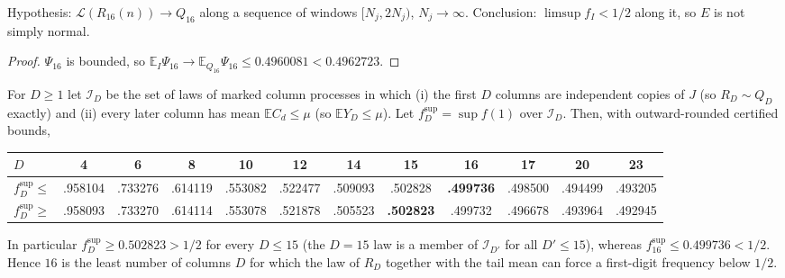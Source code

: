 \documentclass[11pt]{article}
\newcommand{\Ex}{\mathbb E}
\newcommand{\Av}{\mathbb E}
\begin{document}
\begin{corollary}\label{cor:cond16}
Hypothesis: $\mathcal L(R_{16}(n))\to Q_{16}$ along a sequence of windows $[N_j,2N_j)$, $N_j\to\infty$. Conclusion: $\limsup f_I<1/2$ along it, so $E$ is not simply normal.
\end{corollary}
\begin{proof}
$\Psi_{16}$ is bounded, so $\Av_I\Psi_{16}\to\Ex_{Q_{16}}\Psi_{16}\le0.4960081<0.4962723$.
\end{proof}

\begin{theorem}\label{thm:sharp}
For $D\ge1$ let $\mathcal I_D$ be the set of laws of marked column processes in which (i) the first $D$ columns are independent copies of $J$ (so $R_D\sim Q_D$ exactly) and (ii) every later column has mean $\Ex C_d\le\mu$ (so $\Ex Y_D\le\mu$). Let $f^{\sup}_D=\sup f(1)$ over $\mathcal I_D$. Then, with outward-rounded certified bounds,
\begin{center}\footnotesize
\setlength{\tabcolsep}{3.5pt}
\begin{tabular}{@{}lccccccccccc@{}}
\toprule
$D$ & 4 & 6 & 8 & 10 & 12 & 14 & \textbf{15} & \textbf{16} & 17 & 20 & 23\\
\midrule
$f^{\sup}_D\le$ & .958104 & .733276 & .614119 & .553082 & .522477 & .509093 & .502828 & \textbf{.499736} & .498500 & .494499 & .493205\\
$f^{\sup}_D\ge$ & .958093 & .733270 & .614114 & .553078 & .521878 & .505523 & \textbf{.502823} & .499732 & .496678 & .493964 & .492945\\
\bottomrule
\end{tabular}
\end{center}
In particular $f^{\sup}_D\ge0.502823>1/2$ for every $D\le15$ (the $D=15$ law is a member of $\mathcal I_{D'}$ for all $D'\le15$), whereas $f^{\sup}_{16}\le0.499736<1/2$. Hence $16$ is the least number of columns $D$ for which the law of $R_D$ together with the tail mean can force a first-digit frequency below $1/2$.
\end{theorem}
\end{document}
